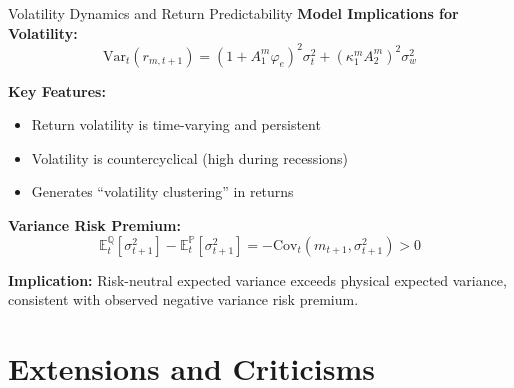 \documentclass{beamer}
\newcommand{\E}{\mathbb{E}}
\newcommand{\Var}{\mathrm{Var}}
\newcommand{\Cov}{\mathrm{Cov}}
\begin{document}
\begin{frame}{Volatility Dynamics and Return Predictability}
    \textbf{Model Implications for Volatility:}
    \begin{equation}
        \Var_t(r_{m,t+1}) = (1 + A_1^m \varphi_e)^2 \sigma_t^2 + (\kappa_1^m A_2^m)^2 \sigma_w^2
    \end{equation}
    
    \textbf{Key Features:}
    \begin{itemize}
        \item Return volatility is time-varying and persistent
        \item Volatility is countercyclical (high during recessions)
        \item Generates ``volatility clustering'' in returns
    \end{itemize}
    
    \vspace{0.3cm}
    \textbf{Variance Risk Premium:}
    \begin{equation}
        \E_t^{\mathbb{Q}}[\sigma_{t+1}^2] - \E_t^{\mathbb{P}}[\sigma_{t+1}^2] = -\Cov_t(m_{t+1}, \sigma_{t+1}^2) > 0
    \end{equation}
    
    \textbf{Implication:} Risk-neutral expected variance exceeds physical expected variance, consistent with observed negative variance risk premium.
\end{frame}

\section{Extensions and Criticisms}
\end{document}
